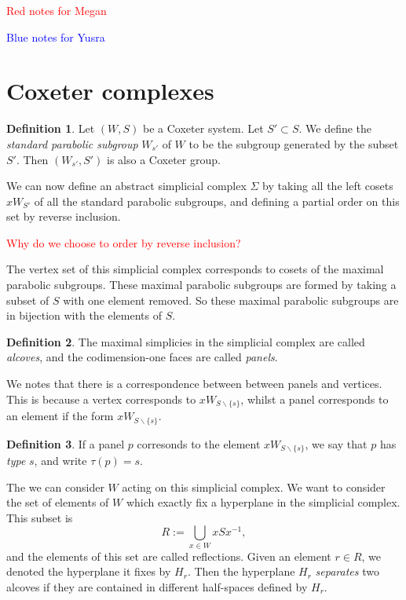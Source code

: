 \documentclass[12pt]{article}
\begin{document}
\newtheorem{theorem}{Theorem}
\theoremstyle{definition}
\newtheorem{definition}{Definition}
\newtheorem{example}{Example}
\newtheorem{lemma}{Lemma}
\newcommand{\uw}{\mathcal{U}(W,X)}
\newcommand{\W}{$(W,S)$}
\newcommand{\ix}{\textit}
\newcommand{\tr}{\textcolor{red}}
\newcommand{\sg}{$\Sigma$}
\tableofcontents 



\textcolor{red}{Red notes for Megan}

\textcolor{blue}{Blue notes for Yusra}
\section{Coxeter complexes}
\begin{definition}
    Let $(W,S)$ be a Coxeter system. Let $S'\subset S$. We define the \textit{standard parabolic subgroup} $W_{s'}$ of $W$ to be the subgroup generated by the subset $S'$. Then $(W_{s'},S')$ is also a Coxeter group. 
\end{definition}

We can now define an abstract simplicial complex $\Sigma$ by taking all the left cosets $xW_{S'}$ of all the standard parabolic subgroups, and defining a partial order on this set by reverse inclusion. 

\textcolor{red}{Why do we choose to order by reverse inclusion?}

The vertex set of this simplicial complex corresponds to cosets of the maximal parabolic subgroups. These maximal parabolic subgroups are formed by taking a subset of $S$ with one element removed. So these maximal parabolic subgroups are in bijection with the elements of $S$. 


\begin{definition}
    The maximal simplicies in the simplicial complex are called \textit{alcoves}, and the codimension-one faces are called \textit{panels}.  
\end{definition}

We notes that there is a correspondence between between panels and vertices. This is because a vertex corresponds to $xW_{S\backslash \{s\}}$, whilst a panel corresponds to an element if the form $xW_{S\backslash \{s\}}$. 

\begin{definition}
    If a panel $p$ corresonds to the element $xW_{S\backslash \{s\}}$, we say that $p$ has \ix{type} $s$, and write $\tau(p)=s$. 
\end{definition}

The we can consider $W$ acting on this simplicial complex.
We want to consider the set of elements of $W$ which exactly fix a hyperplane in the simplicial complex. This subset is
\[R:=\bigcup_{x\in W}xSx^{-1},\]
and the elements of this set are called reflections. Given an element $r\in R$, we denoted the hyperplane it fixes by $H_r$. Then the hyperplane $H_r$ \ix{separates} two alcoves if they are contained in different half-spaces defined by $H_r$. 
\end{document}
